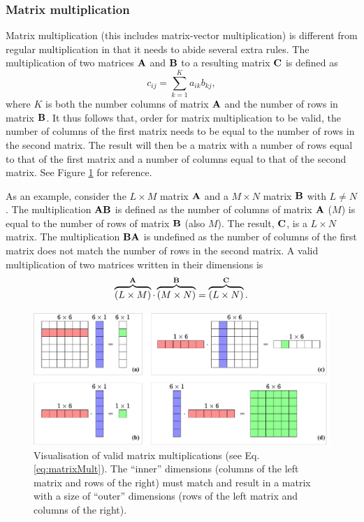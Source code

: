 \subsubsection{Matrix multiplication}
Matrix multiplication (this includes matrix-vector multiplication) is different from regular multiplication in that it needs to abide several extra rules. The multiplication of two matrices $\mathbf{A}$ and $\mathbf{B}$ to a resulting matrix $\mathbf{C}$ is defined as
\begin{equation}\label{eq:matrixMult}
    c_{ij} = \sum_{k=1}^K a_{ik} b_{kj},
\end{equation}
where $K$ is both the number columns of matrix $\mathbf{A}$ and the number of rows in matrix $\mathbf{B}$. It thus follows that, order for matrix multiplication to be valid, the number of columns of the first matrix needs to be equal to the number of rows in the second matrix. The result will then be a matrix with a number of rows equal to that of the first matrix and a number of columns equal to that of the second matrix. See Figure \ref{fig:matrixVector} for reference.

As an example, consider the $L\times M$ matrix $
\mathbf{A}$ and a $M\times N$ matrix $\mathbf{B}$ with $L\neq N$. The multiplication $\mathbf{A}\mathbf{B}$ is defined as the number of columns of matrix $\mathbf{A}$ ($M$) is equal to the number of rows of matrix $\mathbf{B}$ (also $M$). The result, $\mathbf{C}$, is a $L \times N$ matrix. The multiplication $\mathbf{B}\mathbf{A}$ is undefined as the number of columns of the first matrix does not match the number of rows in the second matrix. A valid multiplication of two matrices written in their dimensions is
\begin{equation}
    \overbrace{(L\times M)}^{\mathbf{A}}\cdot \overbrace{(M\times N)}^{\mathbf{B}} = \overbrace{(L
    \times N)}^{\mathbf{C}}.
\end{equation}

\begin{figure}[h]
    \includegraphics[width=\textwidth]{figures/analysis/matrixVector.pdf}
    \caption{Visualisation of valid matrix multiplications (see Eq. \eqref{eq:matrixMult}). The ``inner'' dimensions (columns of the left matrix and rows of the right) must match and result in a matrix with a size of ``outer'' dimensions (rows of the left matrix and columns of the right). \label{fig:matrixVector}}
\end{figure}


